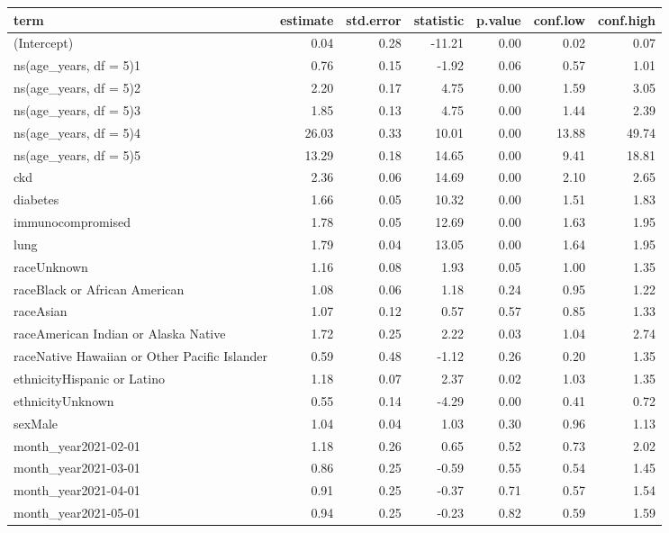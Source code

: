 \begin{table}[!htbp]
\centering
\begin{tabular}{lrrrrrr}
  \hline
term & estimate & std.error & statistic & p.value & conf.low & conf.high \\ 
  \hline
(Intercept) & 0.04 & 0.28 & -11.21 & 0.00 & 0.02 & 0.07 \\ 
  ns(age\_years, df = 5)1 & 0.76 & 0.15 & -1.92 & 0.06 & 0.57 & 1.01 \\ 
  ns(age\_years, df = 5)2 & 2.20 & 0.17 & 4.75 & 0.00 & 1.59 & 3.05 \\ 
  ns(age\_years, df = 5)3 & 1.85 & 0.13 & 4.75 & 0.00 & 1.44 & 2.39 \\ 
  ns(age\_years, df = 5)4 & 26.03 & 0.33 & 10.01 & 0.00 & 13.88 & 49.74 \\ 
  ns(age\_years, df = 5)5 & 13.29 & 0.18 & 14.65 & 0.00 & 9.41 & 18.81 \\ 
  ckd & 2.36 & 0.06 & 14.69 & 0.00 & 2.10 & 2.65 \\ 
  diabetes & 1.66 & 0.05 & 10.32 & 0.00 & 1.51 & 1.83 \\ 
  immunocompromised & 1.78 & 0.05 & 12.69 & 0.00 & 1.63 & 1.95 \\ 
  lung & 1.79 & 0.04 & 13.05 & 0.00 & 1.64 & 1.95 \\ 
  raceUnknown & 1.16 & 0.08 & 1.93 & 0.05 & 1.00 & 1.35 \\ 
  raceBlack or African American & 1.08 & 0.06 & 1.18 & 0.24 & 0.95 & 1.22 \\ 
  raceAsian & 1.07 & 0.12 & 0.57 & 0.57 & 0.85 & 1.33 \\ 
  raceAmerican Indian or Alaska Native & 1.72 & 0.25 & 2.22 & 0.03 & 1.04 & 2.74 \\ 
  raceNative Hawaiian or Other Pacific Islander & 0.59 & 0.48 & -1.12 & 0.26 & 0.20 & 1.35 \\ 
  ethnicityHispanic or Latino & 1.18 & 0.07 & 2.37 & 0.02 & 1.03 & 1.35 \\ 
  ethnicityUnknown & 0.55 & 0.14 & -4.29 & 0.00 & 0.41 & 0.72 \\ 
  sexMale & 1.04 & 0.04 & 1.03 & 0.30 & 0.96 & 1.13 \\ 
  month\_year2021-02-01 & 1.18 & 0.26 & 0.65 & 0.52 & 0.73 & 2.02 \\ 
  month\_year2021-03-01 & 0.86 & 0.25 & -0.59 & 0.55 & 0.54 & 1.45 \\ 
  month\_year2021-04-01 & 0.91 & 0.25 & -0.37 & 0.71 & 0.57 & 1.54 \\ 
  month\_year2021-05-01 & 0.94 & 0.25 & -0.23 & 0.82 & 0.59 & 1.59 \\ 

\end{tabular}
\end{table}
